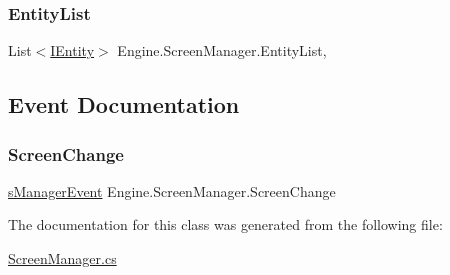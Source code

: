 \subsubsection{\texorpdfstring{Entity\+List}{EntityList}}
{\footnotesize\ttfamily List$<$\hyperlink{a00438}{I\+Entity}$>$ Engine.\+Screen\+Manager.\+Entity\+List\hspace{0.3cm}{\ttfamily [get]}, {\ttfamily [set]}}



\subsection{Event Documentation}
\mbox{\label{a00538_ab29ea82cff043c98756eaa9f538a72e7}} 
\subsubsection{\texorpdfstring{Screen\+Change}{ScreenChange}}
{\footnotesize\ttfamily \hyperlink{a00538_ad442d9999cb6f335509f21ddb533bd76}{s\+Manager\+Event} Engine.\+Screen\+Manager.\+Screen\+Change}



The documentation for this class was generated from the following file\+:\begin{DoxyCompactItemize}
\item 
\hyperlink{a00185}{Screen\+Manager.\+cs}\end{DoxyCompactItemize}
